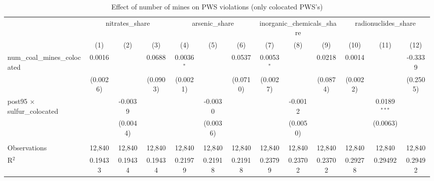 
\begin{table}[htbp]
   \caption{\label{olsrf2sls_nummine_mine_vio_1985to2005colocate} Effect of number of mines on PWS violations (only colocated PWS's)}
   \bigskip
   \centering
   \begin{adjustbox}{width = \textwidth, center}
      \begin{tabular}{lcccccccccccc}
         \toprule
          & \multicolumn{3}{c}{nitrates\_share} & \multicolumn{3}{c}{arsenic\_share} & \multicolumn{3}{c}{inorganic\_chemicals\_share} & \multicolumn{3}{c}{radionuclides\_share}\\
                                                            & (1)           & (2)           & (3)           & (4)           & (5)           & (6)           & (7)           & (8)                   & (9)                   & (10)                  & (11)           & (12)\\  
         \midrule 
         num\_coal\_mines\_colocated                        & 0.0016        &               & 0.0688        & 0.0036$^{*}$  &               & 0.0537        & 0.0053$^{*}$  &                       & 0.0218                & 0.0014                &                & -0.3339\\   
                                                            & (0.0026)      &               & (0.0903)      & (0.0021)      &               & (0.0710)      & (0.0027)      &                       & (0.0874)              & (0.0022)              &                & (0.2505)\\   
         post95 $\times$ sulfur\_colocated                  &               & -0.0039       &               &               & -0.0030       &               &               & -0.0012               &                       &                       & 0.0189$^{***}$ &   \\   
                                                            &               & (0.0044)      &               &               & (0.0036)      &               &               & (0.0050)              &                       &                       & (0.0063)       &   \\   
          \\
         Observations                                       & 12,840        & 12,840        & 12,840        & 12,840        & 12,840        & 12,840        & 12,840        & 12,840                & 12,840                & 12,840                & 12,840         & 12,840\\  
         R$^2$                                              & 0.19433       & 0.19434       & 0.19434       & 0.21979       & 0.21918       & 0.21918       & 0.23799       & 0.23702               & 0.23702               & 0.29278               & 0.29492        & 0.29492\\  

\end{tabular}
\end{adjustbox}
\end{table}
